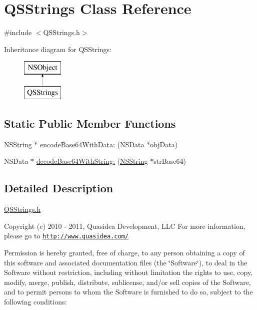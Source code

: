 \hypertarget{interface_q_s_strings}{
\section{\-Q\-S\-Strings \-Class \-Reference}
\label{interface_q_s_strings}
}


{\ttfamily \#include $<$\-Q\-S\-Strings.\-h$>$}

\-Inheritance diagram for \-Q\-S\-Strings\-:\begin{figure}[H]
\begin{center}
\leavevmode
\includegraphics[height=2.000000cm]{interface_q_s_strings}
\end{center}
\end{figure}
\subsection*{\-Static \-Public \-Member \-Functions}
\begin{DoxyCompactItemize}
\item 
\hyperlink{class_n_s_string}{\-N\-S\-String} $\ast$ \hyperlink{interface_q_s_strings_a25253710a89549a1859331b71756b74f}{encode\-Base64\-With\-Data\-:} (\-N\-S\-Data $\ast$obj\-Data)
\item 
\-N\-S\-Data $\ast$ \hyperlink{interface_q_s_strings_a52b5b5d62c7fb5059a7c21693d29b500}{decode\-Base64\-With\-String\-:} (\hyperlink{class_n_s_string}{\-N\-S\-String} $\ast$str\-Base64)
\end{DoxyCompactItemize}


\subsection{\-Detailed \-Description}
\hyperlink{_q_s_strings_8h}{\-Q\-S\-Strings.\-h}

\-Copyright (c) 2010 -\/ 2011, \-Quasidea \-Development, \-L\-L\-C \-For more information, please go to \href{http://www.quasidea.com/}{\tt http\-://www.\-quasidea.\-com/}

\-Permission is hereby granted, free of charge, to any person obtaining a copy of this software and associated documentation files (the \char`\"{}\-Software\char`\"{}), to deal in the \-Software without restriction, including without limitation the rights to use, copy, modify, merge, publish, distribute, sublicense, and/or sell copies of the \-Software, and to permit persons to whom the \-Software is furnished to do so, subject to the following conditions\-:

